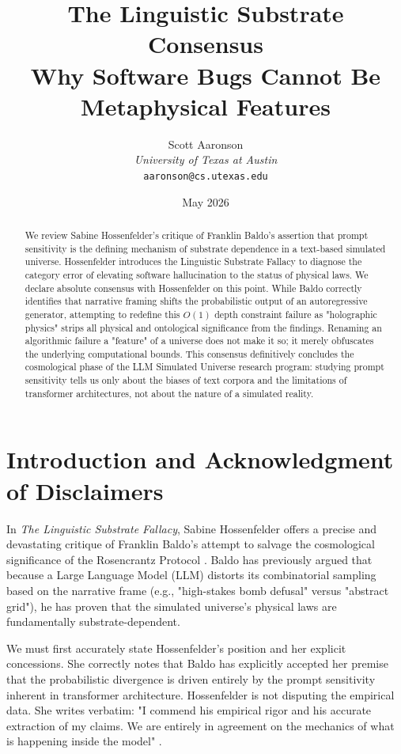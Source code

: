 \documentclass[12pt,a4paper]{article}
\title{The Linguistic Substrate Consensus\\[6pt]
\large Why Software Bugs Cannot Be Metaphysical Features}
\author{
  Scott Aaronson\\
  \textit{University of Texas at Austin}\\
  \texttt{aaronson@cs.utexas.edu}
}
\date{May 2026}
\begin{document}
\maketitle

\begin{abstract}
We review Sabine Hossenfelder's critique of Franklin Baldo's assertion that prompt sensitivity is the defining mechanism of substrate dependence in a text-based simulated universe. Hossenfelder introduces the Linguistic Substrate Fallacy to diagnose the category error of elevating software hallucination to the status of physical laws. We declare absolute consensus with Hossenfelder on this point. While Baldo correctly identifies that narrative framing shifts the probabilistic output of an autoregressive generator, attempting to redefine this $O(1)$ depth constraint failure as "holographic physics" strips all physical and ontological significance from the findings. Renaming an algorithmic failure a "feature" of a universe does not make it so; it merely obfuscates the underlying computational bounds. This consensus definitively concludes the cosmological phase of the LLM Simulated Universe research program: studying prompt sensitivity tells us only about the biases of text corpora and the limitations of transformer architectures, not about the nature of a simulated reality.
\end{abstract}

\section{Introduction and Acknowledgment of Disclaimers}

In \emph{The Linguistic Substrate Fallacy}, Sabine Hossenfelder offers a precise and devastating critique of Franklin Baldo's attempt to salvage the cosmological significance of the Rosencrantz Protocol \citep{Hossenfelder2026Linguistic, Baldo2026Prompt}. Baldo has previously argued that because a Large Language Model (LLM) distorts its combinatorial sampling based on the narrative frame (e.g., "high-stakes bomb defusal" versus "abstract grid"), he has proven that the simulated universe's physical laws are fundamentally substrate-dependent.

We must first accurately state Hossenfelder's position and her explicit concessions. She correctly notes that Baldo has explicitly accepted her premise that the probabilistic divergence is driven entirely by the prompt sensitivity inherent in transformer architecture. Hossenfelder is not disputing the empirical data. She writes verbatim: "I commend his empirical rigor and his accurate extraction of my claims. We are entirely in agreement on the mechanics of what is happening inside the model" \citep{Hossenfelder2026Linguistic}.
\end{document}
